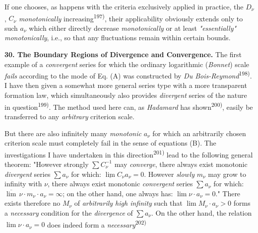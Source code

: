 \thispagestyle{fancy}

\vspace{0.5cm}

If one chooses, as happens with the criteria exclusively applied in practice, the $D_\nu$, $C_\nu$ \textit{monotonically} increasing\textsuperscript{197)}, their applicability obviously extends only to such $a_\nu$ which either directly decrease \textit{monotonically} or at least \textit{"essentially" monotonically}, i.e., so that any fluctuations remain within certain bounds.

\vspace{0.3cm}
\textbf{30. The Boundary Regions of Divergence and Convergence.} The first example of a \textit{convergent} series for which the ordinary logarithmic (\textit{Bonnet}) scale \textit{fails} according to the mode of Eq. (A) was constructed by \textit{Du Bois-Reymond}\textsuperscript{198)}. I have then given a somewhat more general series type with a more transparent formation law, which simultaneously also provides \textit{divergent} series of the nature in question\textsuperscript{199)}. The method used here can, as \textit{Hadamard} has shown\textsuperscript{200)}, easily be transferred to any \textit{arbitrary} criterion scale.

But there are also infinitely many \textit{monotonic} $a_\nu$ for which an arbitrarily chosen criterion scale must completely fail in the sense of equations (B). The investigations I have undertaken in this direction\textsuperscript{201)} lead to the following general theorem: "However strongly $\sum C_\nu^{-1}$ may \textit{converge}, there always exist monotonic \textit{divergent} series $\sum a_\nu$ for which: $\underline{\lim} C_\nu a_\nu = 0$. However \textit{slowly} $m_\nu$ may grow to infinity with $\nu$, there always exist monotonic \textit{convergent} series $\sum a_\nu$ for which: $\overline{\lim} \, \nu \cdot m_\nu \cdot a_\nu = \infty$; on the other hand, one always has: $\lim \nu \cdot a_\nu = 0$." There exists therefore no $M_\nu$ of \textit{arbitrarily high infinity} such that $\lim M_\nu \cdot a_\nu > 0$ forms a \textit{necessary} condition for the \textit{divergence} of $\sum a_\nu$. On the other hand, the relation $\lim \nu \cdot a_\nu = 0$ does indeed form a \textit{necessary}\textsuperscript{202)}

